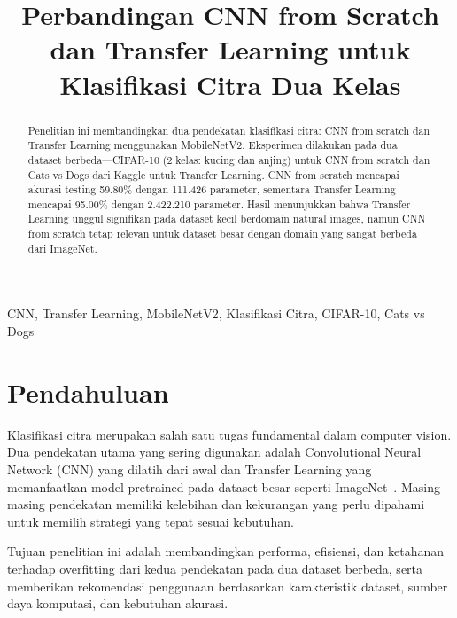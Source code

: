 \documentclass[conference]{IEEEtran}
\begin{document}
\title{Perbandingan CNN from Scratch dan Transfer Learning untuk Klasifikasi Citra Dua Kelas}

\author{
}

\maketitle

\begin{abstract}
Penelitian ini membandingkan dua pendekatan klasifikasi citra: CNN from scratch dan Transfer Learning menggunakan MobileNetV2. Eksperimen dilakukan pada dua dataset berbeda—CIFAR-10 (2 kelas: kucing dan anjing) untuk CNN from scratch dan Cats vs Dogs dari Kaggle untuk Transfer Learning. CNN from scratch mencapai akurasi testing 59.80\% dengan 111.426 parameter, sementara Transfer Learning mencapai 95.00\% dengan 2.422.210 parameter. Hasil menunjukkan bahwa Transfer Learning unggul signifikan pada dataset kecil berdomain natural images, namun CNN from scratch tetap relevan untuk dataset besar dengan domain yang sangat berbeda dari ImageNet.
\end{abstract}

\begin{IEEEkeywords}
CNN, Transfer Learning, MobileNetV2, Klasifikasi Citra, CIFAR-10, Cats vs Dogs
\end{IEEEkeywords}

\section{Pendahuluan}
Klasifikasi citra merupakan salah satu tugas fundamental dalam computer vision. Dua pendekatan utama yang sering digunakan adalah Convolutional Neural Network (CNN) yang dilatih dari awal dan Transfer Learning yang memanfaatkan model pretrained pada dataset besar seperti ImageNet~\cite{imagenet}. Masing-masing pendekatan memiliki kelebihan dan kekurangan yang perlu dipahami untuk memilih strategi yang tepat sesuai kebutuhan.

Tujuan penelitian ini adalah membandingkan performa, efisiensi, dan ketahanan terhadap overfitting dari kedua pendekatan pada dua dataset berbeda, serta memberikan rekomendasi penggunaan berdasarkan karakteristik dataset, sumber daya komputasi, dan kebutuhan akurasi.
\end{document}
